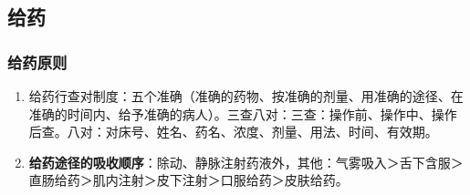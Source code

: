 \documentclass[11pt, a4paper]{ctexart}
\begin{document}
\subsection{给药}
\subsubsection{给药原则}
\begin{enumerate}
	\item 给药行查对制度：五个准确（准确的药物、按准确的剂量、用准确的途径、在准确的时间内、给予准确的病人）。三查八对：三查：操作前、操作中、操作后查。八对：对床号、姓名、药名、浓度、剂量、用法、时间、有效期。
	\item \textbf{给药途径的吸收顺序}：除动、静脉注射药液外，其他：气雾吸入＞舌下含服＞直肠给药＞肌内注射＞皮下注射＞口服给药＞皮肤给药。
\end{enumerate}
\end{document}
